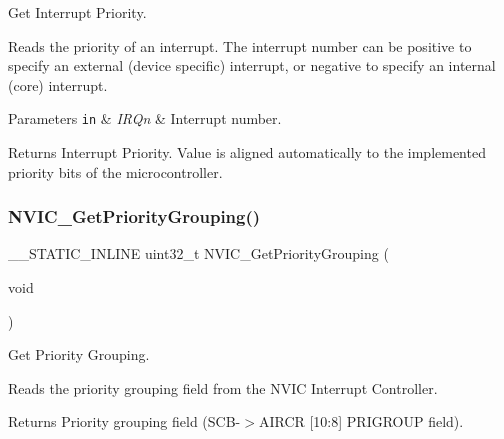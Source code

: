 Get Interrupt Priority. 

Reads the priority of an interrupt. The interrupt number can be positive to specify an external (device specific) interrupt, or negative to specify an internal (core) interrupt. 
\begin{DoxyParams}[1]{Parameters}
\mbox{\tt in}  & {\em I\+R\+Qn} & Interrupt number. \\
\hline
\end{DoxyParams}
\begin{DoxyReturn}{Returns}
Interrupt Priority. Value is aligned automatically to the implemented priority bits of the microcontroller. 
\end{DoxyReturn}
\mbox{\label{group___c_m_s_i_s___core___n_v_i_c_functions_ga394f7ce2ca826c0da26284d17ac6524d}} 
\subsubsection{\texorpdfstring{N\+V\+I\+C\+\_\+\+Get\+Priority\+Grouping()}{NVIC\_GetPriorityGrouping()}}
{\footnotesize\ttfamily \+\_\+\+\_\+\+S\+T\+A\+T\+I\+C\+\_\+\+I\+N\+L\+I\+NE uint32\+\_\+t N\+V\+I\+C\+\_\+\+Get\+Priority\+Grouping (\begin{DoxyParamCaption}\item[{void}]{ }\end{DoxyParamCaption})}



Get Priority Grouping. 

Reads the priority grouping field from the N\+V\+IC Interrupt Controller. \begin{DoxyReturn}{Returns}
Priority grouping field (S\+C\+B-\/$>$A\+I\+R\+CR \mbox{[}10\+:8\mbox{]} P\+R\+I\+G\+R\+O\+UP field). 
\end{DoxyReturn}
\mbox{\label{group___c_m_s_i_s___core___n_v_i_c_functions_ga3ecf446519da33e1690deffbf5be505f}} 
